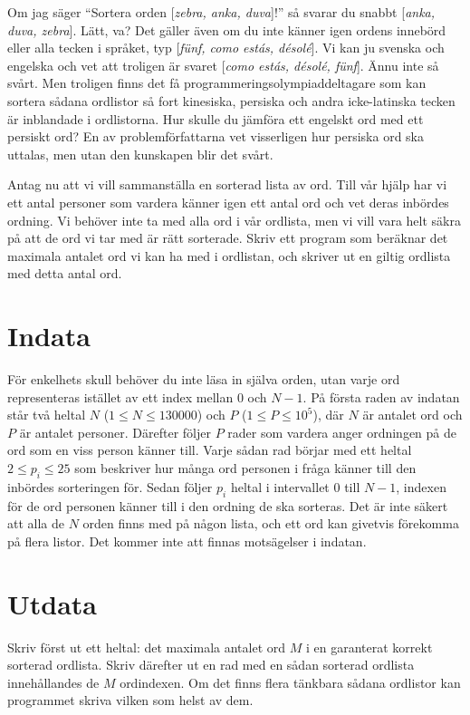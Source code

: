 
Om jag säger ``Sortera orden [\emph{zebra, anka, duva}]!'' så svarar du snabbt [\emph{anka, duva, zebra}]. Lätt, va? Det gäller även om du inte känner igen ordens innebörd eller alla tecken i språket, typ [\emph{fünf, como estás, désolé}]. Vi kan ju svenska och engelska och vet att troligen är svaret [\emph{como estás, désolé, fünf}]. Ännu inte så svårt. Men troligen finns det få programmeringsolympiaddeltagare som kan sortera sådana ordlistor så fort kinesiska, persiska och andra icke-latinska tecken är inblandade i ordlistorna. Hur skulle du jämföra ett engelskt ord med ett persiskt ord? En av problemförfattarna vet visserligen hur persiska ord ska uttalas, men utan den kunskapen blir det svårt.


Antag nu att vi vill sammanställa en sorterad lista av ord. Till vår hjälp har vi ett antal personer som vardera känner igen ett antal ord och vet deras inbördes ordning. Vi behöver inte ta med alla ord i vår ordlista, men vi vill vara helt säkra på att de ord vi tar med är rätt sorterade. Skriv ett program som beräknar det maximala antalet ord vi kan ha med i ordlistan, och skriver ut en giltig ordlista med detta antal ord.

\section*{Indata}
För enkelhets skull behöver du inte läsa in själva orden, utan varje ord representeras istället av ett index mellan $0$ och $N-1$. På första raden av indatan står två heltal $N$ ($1 \leq N \leq 130000$) och $P$ ($1 \leq P \leq 10^5$), där $N$ är antalet ord och $P$ är antalet personer. Därefter följer $P$ rader som vardera anger ordningen på de ord som en viss person känner till. Varje sådan rad börjar med ett heltal $2 \leq p_i \leq 25$ som beskriver hur många ord personen i fråga känner till den inbördes sorteringen för. Sedan följer $p_i$ heltal i intervallet $0$ till $N-1$, indexen för de ord personen känner till i den ordning de ska sorteras. Det är inte säkert att alla de $N$ orden finns med på någon lista, och ett ord kan givetvis förekomma på flera listor. Det kommer inte att finnas motsägelser i indatan.


\section*{Utdata}
Skriv först ut ett heltal: det maximala antalet ord $M$ i en garanterat korrekt sorterad ordlista. Skriv därefter
ut en rad med en sådan sorterad ordlista innehållandes de $M$ ordindexen. Om det finns flera tänkbara sådana
ordlistor kan programmet skriva vilken som helst av dem.


